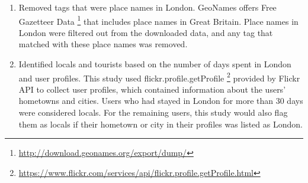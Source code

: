 \documentclass{article}
\theoremstyle{remark}
\begin{document}
\begin{enumerate}
    \item Removed tags that were place names in London. GeoNames offers Free Gazetteer Data \footnote{\url{http://download.geonames.org/export/dump/}} that includes place names in Great Britain. Place names in London were filtered out from the downloaded data, and any tag that matched with these place names was removed.
    \item Identified locals and tourists based on the number of days spent in London and user profiles. This study used flickr.profile.getProfile \footnote{\url{https://www.flickr.com/services/api/flickr.profile.getProfile.html}} provided by Flickr API to collect user profiles, which contained information about the users' hometowns and cities. Users who had stayed in London for more than 30 days were considered locals. For the remaining users, this study would also flag them as locals if their hometown or city in their profiles was listed as London.
\end{enumerate}
\end{document}
